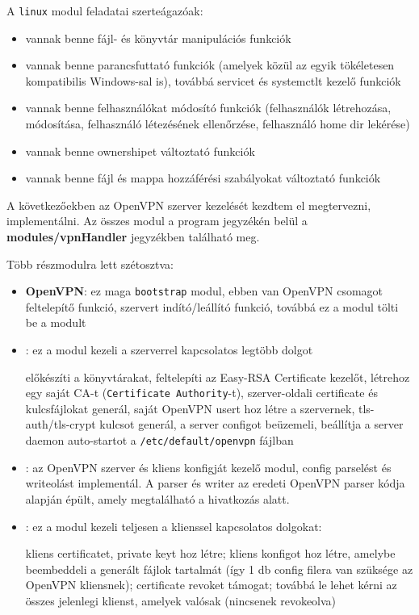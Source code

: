 A \texttt{linux} modul feladatai szerteágazóak:

\begin{itemize}
	\item vannak benne fájl- és könyvtár manipulációs funkciók
	\item vannak benne parancsfuttató funkciók (amelyek közül az egyik tökéletesen kompatibilis Windows-sal is), továbbá servicet és systemctlt kezelő funkciók
	\item vannak benne felhasználókat módosító funkciók (felhasználók létrehozása, módosítása, felhasználó létezésének ellenőrzése, felhasználó home dir lekérése)
	\item vannak benne ownershipet változtató funkciók
	\item vannak benne fájl és mappa hozzáférési szabályokat változtató funkciók
\end{itemize}


A következőekben az OpenVPN szerver kezelését kezdtem el megtervezni, implementálni. Az összes modul a program jegyzékén belül a \textbf{modules/vpnHandler} jegyzékben található meg.

Több részmodulra lett szétosztva:
\begin{itemize}
	\item \textbf{OpenVPN}: ez maga \texttt{bootstrap} modul, ebben van OpenVPN csomagot feltelepítő funkció, szervert indító/leállító funkció, továbbá ez a modul tölti be a \texttt{} modult
	\item \textbf{}: ez a modul kezeli a szerverrel kapcsolatos legtöbb dolgot
	
	előkészíti a könyvtárakat, feltelepíti az Easy-RSA Certificate kezelőt, létrehoz egy saját CA-t (\texttt{Certificate Authority}-t), szerver-oldali certificate és kulcsfájlokat generál, saját OpenVPN usert hoz létre a szervernek, tls-auth/tls-crypt kulcsot generál, a server configot beüzemeli, beállítja a server daemon auto-startot a \texttt{/etc/default/openvpn} fájlban

	\item \textbf{}: az OpenVPN szerver és kliens konfigját kezelő modul, config parselést és writeolást implementál. A parser és writer az eredeti OpenVPN parser kódja alapján épült, amely megtalálható a \cite{openvpn_parser} hivatkozás alatt.
	\item \textbf{}: ez a modul kezeli teljesen a klienssel kapcsolatos dolgokat:
	
	kliens certificatet, private keyt hoz létre; kliens konfigot hoz létre, amelybe beembeddeli a generált fájlok tartalmát (így 1 db config filera van szüksége az OpenVPN kliensnek); certificate revoket támogat; továbbá le lehet kérni az összes jelenlegi klienst, amelyek valósak (nincsenek revokeolva)
\end{itemize}


